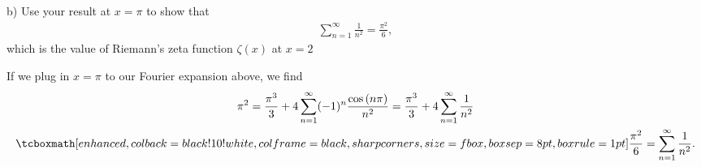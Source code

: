 b) Use your result at $x = \pi$ to show that 
\begin{eqnarray}
    \label{eq:3.175}
    \sum_{n=1}^{\infty} \frac{1}{n^2} = \frac{\pi^2}{6}
,\end{eqnarray}
which is the value of Riemann's zeta function $\zeta(x)$ at $x = 2$

If we plug in $x = \pi$ to our Fourier expansion above, we find
\begin{gather}
    \label{eq:x-pi-sum}
    \pi^2 = \frac{\pi^3}{3} + 4 \sum_{n=1}^{\infty} (-1)^{n} \frac{\cos{(n\pi)}}{n^2} = \frac{\pi^3}{3} + 4 \sum_{n=1}^{\infty} \frac{1}{n^2} \notag \\
    \eqbox{
    \frac{\pi^2}{6} = \sum_{n=1}^{\infty} \frac{1}{n^2}
}
.\end{gather}



